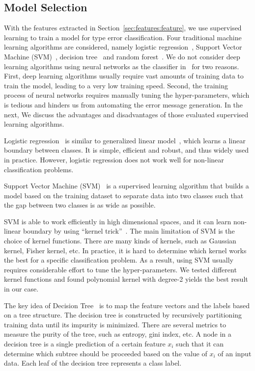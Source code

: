 \documentclass[12pt]{report}	%
\begin{document}
\subsection{Model Selection}
\label{sec:mlmodle}

With the features extracted in Section~\ref{sec:features:feature},
we use supervised learning to train a model for type error classification.
Four traditional machine learning algorithms are considered,
namely logistic regression~\cite{walker1967estimation}, 
Support Vector Machine (SVM)~\cite{cortes1995support}, 
decision tree~\cite{quinlan2014c4} and random forest~\cite{breiman2001random}.
%
We do not consider deep learning algorithms using neural networks as the classifier in \newCompiler\ for two reasons.
First, deep learning algorithms usually require vast amounts of training data to train the model, 
leading to a very low training speed.
Second, the training process of neural networks requires manually tuning the hyper-parameters,
which is tedious and hinders us from automating the error message generation.
%
In the next, We discuss the advantages and disadvantages of those evaluated supervised learning algorithms.

%
Logistic regression~\cite{walker1967estimation} is similar to generalized linear model~\cite{mccullagh1984generalized},
which learns a linear boundary between classes.
It is simple, efficient and robust, and thus widely used in practice.
However, logistic regression does not work well for non-linear classification problems.

%
Support Vector Machine (SVM)~\cite{cortes1995support} is a supervised learning algorithm that builds
a model based on the training dataset to separate data into two classes
such that the gap between two classes is as wide as possible.

SVM is able to work efficiently in high dimensional spaces,
and it can learn non-linear boundary by using ``kernel trick''~\cite{mika1999fisher}.
%
The main limitation of SVM is the choice of kernel functions.
There are many kinds of kernels, such as Gaussian kernel, Fisher kernel, etc.
In practice, it is hard to determine which kernel works the 
best for a specific classification problem. 
As a result, using SVM usually requires considerable effort to tune the hyper-parameters.
We tested different kernel functions and found polynomial kernel with degree-2
yields the best result in our case.

%
The key idea of Decision Tree~\cite{quinlan2014c4} is to map
the feature vectors and the labels based on a tree structure.
The decision tree is constructed by recursively partitioning training data
until its impurity is minimized.
There are several metrics to measure the purity of the tree, such as entropy, gini index, etc.
A node in a decision tree is a single prediction of a certain feature $x_i$ such that
it can determine which subtree should be proceeded based on the value of $x_i$ of an input data.
Each leaf of the decision tree represents a class label.
\end{document}
